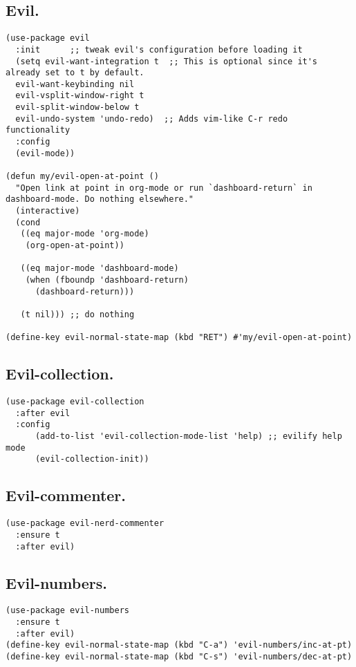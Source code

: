 \documentclass[11pt]{article}
\begin{document}
\subsection{Evil.}
\label{sec:orgfd75dc1}
\begin{verbatim}
(use-package evil
  :init      ;; tweak evil's configuration before loading it
  (setq evil-want-integration t  ;; This is optional since it's already set to t by default.
  evil-want-keybinding nil
  evil-vsplit-window-right t
  evil-split-window-below t
  evil-undo-system 'undo-redo)  ;; Adds vim-like C-r redo functionality
  :config
  (evil-mode))

(defun my/evil-open-at-point ()
  "Open link at point in org-mode or run `dashboard-return` in dashboard-mode. Do nothing elsewhere."
  (interactive)
  (cond
   ((eq major-mode 'org-mode)
    (org-open-at-point))

   ((eq major-mode 'dashboard-mode)
    (when (fboundp 'dashboard-return)
      (dashboard-return)))

   (t nil))) ;; do nothing

(define-key evil-normal-state-map (kbd "RET") #'my/evil-open-at-point)
\end{verbatim}
\subsection{Evil-collection.}
\label{sec:org6274907}
\begin{verbatim}
(use-package evil-collection
  :after evil
  :config
      (add-to-list 'evil-collection-mode-list 'help) ;; evilify help mode
      (evil-collection-init))
\end{verbatim}
\subsection{Evil-commenter.}
\label{sec:org007006c}
\begin{verbatim}
(use-package evil-nerd-commenter
  :ensure t
  :after evil)
\end{verbatim}
\subsection{Evil-numbers.}
\label{sec:orgf4260f3}
\begin{verbatim}
(use-package evil-numbers
  :ensure t
  :after evil)
(define-key evil-normal-state-map (kbd "C-a") 'evil-numbers/inc-at-pt)
(define-key evil-normal-state-map (kbd "C-s") 'evil-numbers/dec-at-pt)
\end{verbatim}
\end{document}
